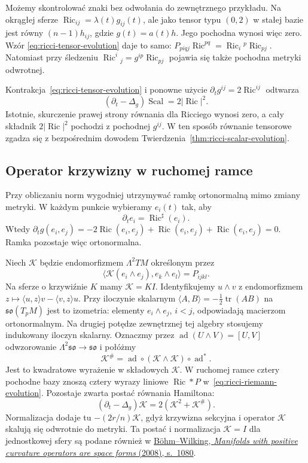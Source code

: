 Możemy skontrolować znaki bez odwołania do
zewnętrznego przykładu. Na okrągłej sferze
$\operatorname{Ric}_{ij}=\lambda(t)g_{ij}(t)$,
ale jako tensor typu $(0,2)$ w stałej bazie
jest równy $(n-1)h_{ij}$, gdzie $g(t)=a(t)h$.
Jego pochodna wynosi więc zero. Wzór
\eqref{eq:ricci-tensor-evolution} daje to samo:
$P_{p i q j}\operatorname{Ric}^{pq}
=\operatorname{Ric}_i{}^p\operatorname{Ric}_{pj}$.
Natomiast przy śledzeniu
$\operatorname{Ric}^i{}_j=g^{ip}\operatorname{Ric}_{pj}$
pojawia się także pochodna metryki odwrotnej.

Kontrakcja~\eqref{eq:ricci-tensor-evolution}
i ponowne użycie
$\partial_tg^{ij}=2\operatorname{Ric}^{ij}$
odtwarza
\[
 (\partial_t-\Delta_g)\operatorname{Scal}
 =2|\operatorname{Ric}|^2.
\]
Istotnie, skurczenie prawej strony równania
dla Ricciego wynosi zero, a cały składnik
$2|\operatorname{Ric}|^2$ pochodzi z pochodnej
$g^{ij}$. W ten sposób równanie tensorowe
zgadza się z bezpośrednim dowodem
Twierdzenia~\ref{thm:ricci-scalar-evolution}.

\subsection*{Operator krzywizny w ruchomej ramce}

Przy obliczaniu norm wygodniej utrzymywać ramkę
ortonormalną mimo zmiany metryki. W każdym punkcie
wybieramy $e_i(t)$ tak, aby
\[
 \partial_t e_i=\operatorname{Ric}^{\sharp}(e_i).
\]
Wtedy
$\partial_tg(e_i,e_j)
=-2\operatorname{Ric}(e_i,e_j)
 +\operatorname{Ric}(e_i,e_j)
 +\operatorname{Ric}(e_i,e_j)=0$.
Ramka pozostaje więc ortonormalna.

Niech $\mathscr K$ będzie endomorfizmem
$\Lambda^2TM$ określonym przez
\[
 \langle\mathscr K(e_i\wedge e_j),
                 e_k\wedge e_l\rangle=P_{ijkl}.
\]
Na sferze o krzywiźnie $K$ mamy $\mathscr K=K I$.
Identyfikujemy $u\wedge v$ z endomorfizmem
$z\mapsto\langle u,z\rangle v-\langle v,z\rangle u$.
Przy iloczynie skalarnym $\langle A,B\rangle=-\tfrac12
\operatorname{tr}(AB)$ na $\mathfrak{so}(T_pM)$ jest to izometria:
elementy $e_i\wedge e_j$, $i<j$, odpowiadają macierzom
ortonormalnym. Na drugiej potędze zewnętrznej tej algebry
stosujemy indukowany iloczyn skalarny. Oznaczmy przez
$\operatorname{ad}(U\wedge V)=[U,V]$ odwzorowanie
$\Lambda^2\mathfrak{so}\to\mathfrak{so}$ i połóżmy
\[
 \mathscr K^\#
  =\operatorname{ad}\circ(\mathscr K\wedge\mathscr K)
                       \circ\operatorname{ad}^{*}.
\]
Jest to kwadratowe wyrażenie w składowych
$\mathscr K$. W ruchomej ramce cztery pochodne
bazy znoszą cztery wyrazy liniowe
$\operatorname{Ric}*P$ w~\eqref{eq:ricci-riemann-evolution}.
Pozostaje zwarta postać równania Hamiltona:
\begin{equation}\label{eq:ricci-curvature-operator-evolution}
 (\partial_t-\Delta_g)\mathscr K
     =2(\mathscr K^2+\mathscr K^\#).
\end{equation}
Normalizacja dodaje tu
$-(2r/n)\mathscr K$, gdyż krzywizna sekcyjna
i operator $\mathscr K$ skalują się odwrotnie
do metryki. Ta postać i normalizacja
$\mathscr K=I$ dla jednostkowej sfery są podane
również w
\href{https://annals.math.princeton.edu/wp-content/uploads/annals-v167-n3-p10.pdf}
{Böhm--Wilking, \emph{Manifolds with positive curvature
operators are space forms} (2008), s.~1080}.

